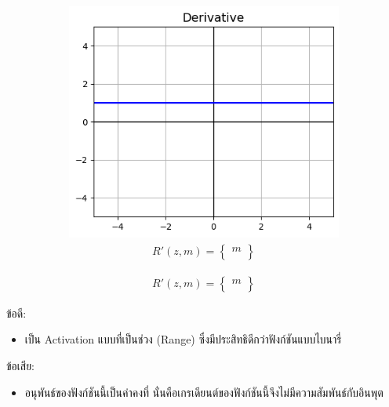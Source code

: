 \begin{itemize}
\begin{figure}[H]
\begin{subfigure}{0.5\textwidth}
                  \includegraphics[width=0.9\linewidth]{fig/actfunc_linear_der.png}
                  \caption{%
                      \begin{equation}
                          \begin{split}R'(z,m) =
                              \begin{Bmatrix}
                                  m \\
                              \end{Bmatrix}
                          \end{split}
                      \end{equation}
                  }
                  \label{fig:actfunc_lin_der}
              \end{subfigure}
          \end{figure}
          ข้อดี:
          \begin{itemize}
              \item เป็น Activation แบบที่เป็นช่วง (Range) ซึ่งมีประสิทธิดีกว่าฟังก์ชันแบบไบนารี่
          \end{itemize}
          ข้อเสีย:
          \begin{itemize}
              \item อนุพันธ์ของฟังก์ชันนี้เป็นค่าคงที่ นั่นคือเกรเดียนต์ของฟังก์ชันนี้จึงไม่มีความสัมพันธ์กับอินพุต
          \end{itemize}


\end{itemize}

